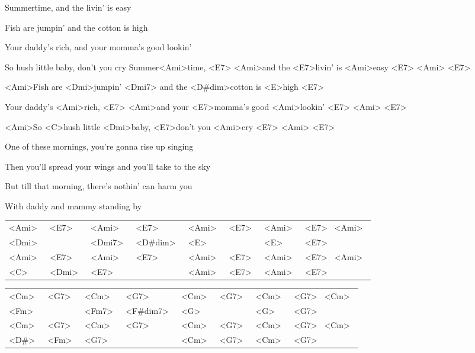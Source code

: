 

\ifdefined\TPBAND
\zs
Summertime,  and the livin' is easy

Fish are jumpin' and the cotton is high
 
Your daddy's rich, and your momma's good lookin'

So hush little baby, don't you cry
\ks
\else
\zs
Summer<Ami>time, <E7> <Ami>and the <E7>livin' is 
<Ami>easy <E7> <Ami> <E7>

<Ami>Fish are <Dmi>jumpin' <Dmi7> and the <D#dim>cotton is 
<E>high <E7>
 
Your daddy's <Ami>rich, <E7> <Ami>and your <E7>momma's 
good <Ami>lookin' <E7> <Ami> <E7>

<Ami>So <C>hush little <Dmi>baby, <E7>don't you 
<Ami>cry <E7> <Ami> <E7>
\ks
\fi

\zs
One of these mornings, you're gonna rise up singing

Then you'll spread your wings and you'll take to the sky

But till that morning, there's nothin' can harm you

With daddy and mammy standing by
\ks

\ifdefined\TPBAND
	
	\begin{table}[h]
	\begin{tabular}{|ll|ll|ll|ll|}
<Ami>~ & <E7>~ & <Ami>~ & <E7>~ & <Ami>~ 
& <E7>~ & <Ami>~ & <E7>~ <Ami>~	\\
<Dmi>~ & & <Dmi7>~ & <D#dim>~ & <E>~ 
& & <E>~ & <E7>~ 	\\
<Ami>~ & <E7>~ & <Ami>~ & <E7>~ & <Ami>~ 
& <E7>~ & <Ami>~ & <E7>~ <Ami>~ 	\\
 <C>~ & <Dmi>~ & <E7>~ 
 & & <Ami>~ & <E7>~ & <Ami>~ 
 & <E7>~ \\
	\end{tabular}
	\end{table}

\begin{table}[h]
\begin{tabular}{|ll|ll|ll|ll|}
<Cm>~ & <G7>~   & <Cm>~   & <G7>~          & <Cm>~ & <G7>~ & <Cm>~ & <G7>~  <Cm>~\\
<Fm>~ &                      & <Fm7>~ & <F#dim7>~       & <G>~   &                   & <G>~   & <G7>~  \\
<Cm>~ & <G7>~   & <Cm>~   & <G7>~          & <Cm>~ & <G7>~ & <Cm>~ & <G7>~  <Cm>~\\
<D#>~    & <Fm>~    & <G7>~     &               & <Cm>~ & <G7>~ & <Cm>~ & <G7>~  \\
\end{tabular}
\end{table}

	\fi
\kp
